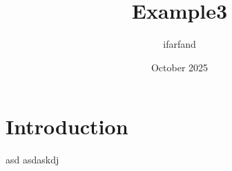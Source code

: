 \documentclass{article}
\title{Example3}
\author{ifarfand }
\date{October 2025}
\begin{document}
\maketitle


\section{Introduction}
asd
asdaskdj
\end{document}
